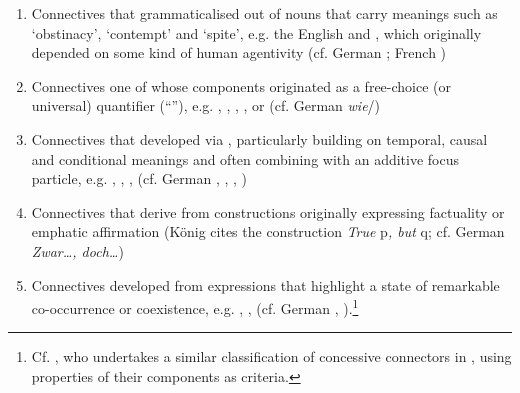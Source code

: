 \begin{enumerate}
\item Connectives that grammati\-calised out of nouns that carry meanings such as ‘obstinacy’, ‘contempt’ and ‘spite’, e.g. the English   and , which originally depended on some kind of human agentivity (cf. German ; French )

\item Connectives one of whose components origi\-nated as a free-choice (or universal) quanti\-fier (“”), e.g. , , , , or  (cf. German  \textit{wie}/)

\item\sloppy Connectives that developed via , particularly building on temporal, causal and conditional meanings and often combining with an additive focus particle, e.g. , , ,  (cf. German , , , )

\item Connectives that derive from constructions originally expressing factuality or emphatic affirmation (König cites the construction \textit{True} p\textit{, but} q; cf. German \textit{Zwar…, doch…})

\item Connectives developed from expressions that highlight a state of remarkable co-occurrence or coexistence, e.g. , ,  (cf. German , ).\footnote{Cf. \citet[293–295]{DiMeola2004}, who undertakes a similar classification of concessive connectors in , using properties of their components as criteria.}
\end{enumerate}

